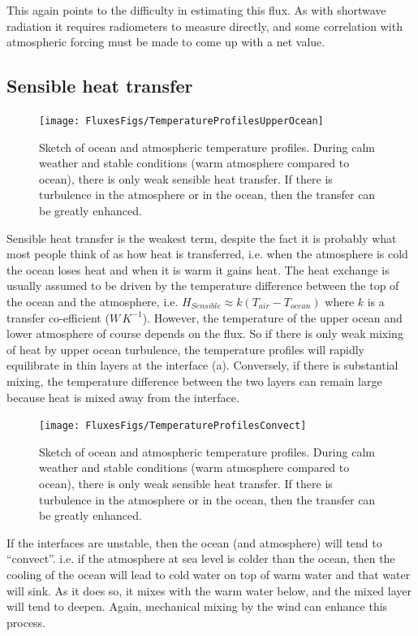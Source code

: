 This again points to the difficulty in estimating this flux.  As with shortwave radiation it requires radiometers to measure directly, and some correlation with atmospheric forcing must be made to come up with a net value.

\subsection{Sensible heat transfer}

\begin{figure}[htb]
\texttt{[image: FluxesFigs/TemperatureProfilesUpperOcean]}
 \caption{Sketch of ocean and atmospheric temperature profiles.  During calm weather and stable conditions (warm atmosphere compared to ocean), there is only weak sensible heat transfer.  If there is turbulence in the atmosphere or in the ocean, then the transfer can be greatly enhanced.}
  \label{fig:TemperatureProfilesUpperOcean}
\end{figure}

Sensible heat transfer is the weakest term, despite the fact it is probably what most people think of as how heat is transferred, i.e. when the atmosphere is cold  the ocean loses heat and when it is warm it gains heat.  The heat exchange is usually assumed to be driven by the temperature difference between the top of the ocean and the atmosphere, i.e. $H_{Sensible} \approx k \left(T_{air} - T_{ocean}\right)$ where $k$ is a transfer co-efficient ($W\, K^{-1}$).  However, the temperature of the upper ocean and lower atmosphere of course depends on the flux. So if there is only weak mixing of heat by upper ocean turbulence, the temperature profiles will rapidly equilibrate in thin layers at the interface (a).  Conversely, if there is substantial mixing, the temperature difference between the two layers can remain large because heat is mixed away from the interface.  

\begin{figure}[htb]
\texttt{[image: FluxesFigs/TemperatureProfilesConvect]}
 \caption{Sketch of ocean and atmospheric temperature profiles.  During calm weather and stable conditions (warm atmosphere compared to ocean), there is only weak sensible heat transfer.  If there is turbulence in the atmosphere or in the ocean, then the transfer can be greatly enhanced.}
  \label{fig:TemperatureProfilesConvect}
\end{figure}

If the interfaces are unstable, then the ocean (and atmosphere) will tend to ``convect''.  i.e. if the atmosphere at sea level is colder than the ocean, then the cooling of the ocean will lead to cold water on top of warm water and that water will sink.  As it does so, it mixes with the warm water below, and the mixed layer will tend to deepen. Again, mechanical mixing by the wind can enhance this process.

